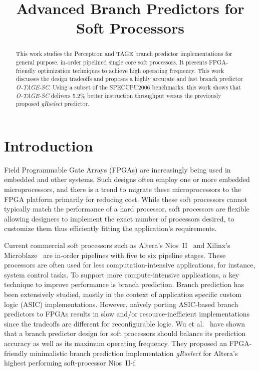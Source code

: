 \documentclass[conference]{IEEEtran}
\begin{document}
\title{Advanced Branch Predictors for Soft Processors}



\maketitle


\begin{abstract}
This work studies the Perceptron and TAGE branch predictor implementations for general purpose, in-order pipelined single core soft processors. It presents FPGA-friendly optimization techniques to achieve high operating frequency. This work discusses the design tradeoffs and proposes a highly accurate and fast branch predictor \textit{O-TAGE-SC}. Using a subset of the SPECCPU2006 benchmarks, this work shows that \textit{O-TAGE-SC} delivers 5.2\% better instruction throughput versus the previously proposed \textit{gRselect} predictor.
\end{abstract}


\IEEEpeerreviewmaketitle


\section{Introduction}
\label{sec:intro}
Field Programmable Gate Arrays (FPGAs) are increasingly being used in embedded and other systems. Such designs often employ one or more embedded microprocessors, and there is a trend to migrate these microprocessors to the FPGA platform primarily for reducing cost. While these soft processors cannot typically match the performance of a hard processor, soft processors are flexible allowing designers to implement the exact number of processors desired, to customize them thus efficiently fitting the application's requirements.

Current commercial soft processors such as Altera's Nios~II~\cite{niosii} and Xilinx's Microblaze~\cite{microblaze} are in-order pipelines with five to six pipeline stages. These processors are often used for less computation-intensive applications, for instance, system control tasks. To support more compute-intensive applications, a key technique to improve performance is branch prediction. Branch prediction has been extensively studied, mostly in the context of application specific custom logic (ASIC) implementations. However, na\"ively porting ASIC-based branch predictors to FPGAs results in slow and/or resource-inefficient implementations since the tradeoffs are different for reconfigurable logic. Wu et al.~\cite{grselect} have shown that a branch predictor design for soft processors should balance its prediction accuracy as well as its maximum operating frequency. They proposed an FPGA-friendly minimalistic branch prediction implementation \textit{gRselect} for Altera's highest performing soft-processor Nios~II-f.
\end{document}
